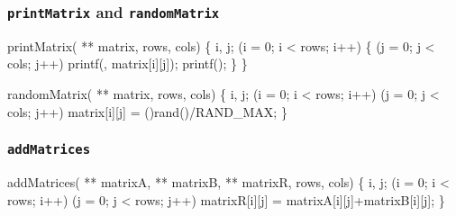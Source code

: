 \documentclass[smaller,table]{beamer} %
\begin{document}
\begin{frame}[fragile]
\frametitle{{\tt printMatrix} and {\tt randomMatrix}}
\begin{semiverbatim}
\scriptsize
\kr\kl{} printMatrix( ** matrix,  rows,
\kl                                   {} cols)
\kl\{
\kl   {} i, j;
\kl
\kl   {} (i = 0; i < rows; i++)
\kl   \{
\kl      {} (j = 0; j < cols; j++)
\kl         printf(, matrix[i][j]);
\kl      printf();
\kl   \}
\kl\}
\end{semiverbatim}

\begin{semiverbatim}
\scriptsize
\kr\kl{} randomMatrix( ** matrix,  rows,
\kl                                    {} cols)
\kl\{
\kl   {} i, j;
\kl   {} (i = 0; i < rows; i++)
\kl      {} (j = 0; j < cols; j++)
\kl         matrix[i][j] = ()rand()/RAND_MAX;
\kl\}
\end{semiverbatim}
\end{frame}

\begin{frame}[fragile]
\frametitle{{\tt addMatrices}}
\begin{semiverbatim}
\scriptsize
\kr\kl{} addMatrices( ** matrixA,  ** matrixB,
\kl                 {} ** matrixR,
\kl                 {} rows,  cols)
\kl\{
\kl   {} i, j;
\kl   {} (i = 0; i < rows; i++)
\kl      {} (j = 0; j < rows; j++)
\kl         matrixR[i][j] = matrixA[i][j]+matrixB[i][j];
\kl\}
\end{semiverbatim}
\end{frame}
\end{document}
